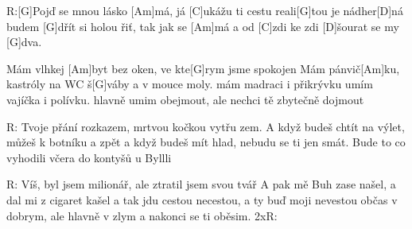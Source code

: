 
R:[G]Pojď se mnou lásko [Am]má,
já [C]ukážu ti cestu reali[G]tou je nádher[D]ná
budem [G]dřít si holou řiť, tak jak se [Am]má
a od [C]zdi ke zdi [D]\null šourat se my [G]dva.


Mám vlhkej [Am]byt bez oken, ve kte[G]rym jsme spokojen
Mám pánvič[Am]ku, kastróly na WC š[G]váby a v mouce moly.
mám madraci i přikrývku umím vajíčka i polívku.
hlavně umim obejmout, ale nechci tě zbytečně dojmout

R:
Tvoje přání rozkazem, mrtvou kočkou vytřu zem.
A když budeš chtít na výlet, můžeš k botníku a zpět
a když budeš mít hlad, nebudu se ti jen smát.
Bude to co vyhodili včera do kontyšů u Byllli

R:
Víš, byl jsem milionář, ale ztratil jsem svou tvář
A pak mě Buh zase našel, a dal mi z cigaret kašel
a tak jdu cestou necestou, a ty buď moji nevestou
občas v dobrym, ale hlavně v zlym a nakonci se ti oběsim.
2xR:
